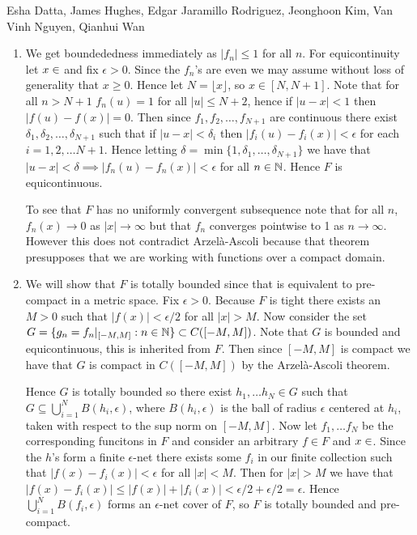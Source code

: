 \begin{solution}{Esha Datta, James Hughes, Edgar Jaramillo Rodriguez, Jeonghoon Kim, Van Vinh Nguyen, Qianhui Wan}
        \begin{enumerate}[label=(\alph*)]
                \item
                        We get boundededness immediately as $|f_n| \leq 1$ for all $n$.
                        For equicontinuity let $x\in \real$ and fix $\epsilon > 0$.
                        Since the $f_n$'s are even we may assume without loss of generality that $x \geq 0$.
                        Hence let $N = \lfloor x \rfloor$, so $x\in [N, N+1]$.
                        Note that for all $n > N+1$ $f_n(u) =1$ for all $|u| \leq N+2$, hence if $|u-x|<1$ then $|f(u) -f(x)|=0$.
                        Then since $f_1, f_2, \ldots, f_{N+1}$ are continuous there exist $\delta_1, \delta_2, \ldots, \delta_{N+1}$ such that if $|u-x| <\delta_i$ then $|f_i(u)-f_i(x)| < \epsilon$ for each $i =1,2, \ldots N+1$.
                        Hence letting $\delta = \min\{1, \delta_1, \ldots, \delta_{N+1} \}$ we have that $|u-x| <\delta \implies |f_n(u)-f_n(x)| < \epsilon$ for all $n\in \mathbb{N}$.
                        Hence $F$ is equicontinuous. 

                        To see that $F$ has no uniformly convergent subsequence note that for all $n$, $f_n(x) \to 0$ as $|x| \to \infty$ but that $f_n$ converges pointwise to 1 as $n\to \infty$.
                        However this does not contradict Arzel\`a-Ascoli because that theorem presupposes that we are working with functions over a compact domain.
                \item
                        We will show that $F$ is totally bounded since that is equivalent to pre-compact in a metric space.
                        Fix $\epsilon >0$.
                        Because $F$ is tight there exists an $M>0$ such that $|f(x)| < \epsilon/2$ for all $|x|>M$.
                        Now consider the set $G = \{g_n= f_n|_{[-M,M]}: n\in \mathbb{N}\} \subset C([-M,M])$.
                        Note that $G$ is bounded and equicontinuous, this is inherited from $F$.
                        Then since $[-M,M]$ is compact we have that $G$ is compact in $C([-M,M])$ by the Arzel\`a-Ascoli theorem. 

                        Hence $G$ is totally bounded so there exist $h_1,\ldots h_N \in G$ such that $G \subseteq \bigcup_{i=1}^N B(h_i,\epsilon)$, where $B(h_i,\epsilon)$ is the ball of radius $\epsilon$ centered at $h_i$, taken with respect to the sup norm on $[-M,M]$.
                        Now let $f_1, \ldots f_N$ be the corresponding funcitons in $F$ and consider an arbitrary $f\in F$ and $x\in \real$.
                        Since the $h$'s form a finite $\epsilon$-net there exists some $f_i$ in our finite collection such that $|f(x)-f_i(x)| < \epsilon$ for all $|x| < M$.
                        Then for $|x|>M$ we have that $|f(x)-f_i(x)| \leq |f(x)| +|f_i(x)| < \epsilon/2 +\epsilon/2 =\epsilon$.
                        Hence $ \bigcup_{i=1}^N B(f_i,\epsilon)$ forms an $\epsilon$-net cover of $F$, so $F$ is totally bounded and pre-compact.
        \end{enumerate}

\end{solution}
